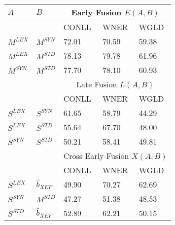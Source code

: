 \begin{table}[]
\centering
\label{my-label}
\begin{tabular}{@{}lllll@{}}
\toprule
    $A$      &    $B$       & \multicolumn{3}{c}{Early Fusion $E(A,B)$}                                            \\ \midrule
          &           & CONLL                      & WNER                      & WGLD                      \\ \cmidrule{3-5}
$M^{LEX}$ & $M^{SYN}$ & 72.01                      & 70.59                     & 59.38                     \\
$M^{LEX}$ & $M^{STD}$ & 78.13                      & 79.78                     & 61.96                     \\
$M^{SYN}$ & $M^{STD}$ & 77.70                      & 78.10                     & 60.93                     \\
\midrule
          &           & \multicolumn{3}{c}{Late Fusion $L(A,B)$}                                             \\
\midrule     
          &           & CONLL                      & WNER                      & WGLD                      \\ \cmidrule{3-5}
$S^{LEX}$ & $S^{SYN}$ & 61.65                      & 58.79                     & 44.29                     \\
$S^{LEX}$ & $S^{STD}$ & 55.64                      & 67.70                     & 48.00                     \\
$S^{SYN}$ & $S^{STD}$ & 50.21                      & 58.41                     & 49.81                     \\
\midrule
          &           & \multicolumn{3}{c}{Cross Early Fusion $X(A,B)$} \\
\midrule
          &           & CONLL                      & WNER                      & WGLD                      \\ \cmidrule{3-5}
$S^{LEX}$ & $\hat{b}_{\scriptscriptstyle XEF}$        & 49.90                      & 70.27                     & 62.69                     \\
$S^{SYN}$ & $M^{STD}$ & 47.27                      & 51.38                     & 48.53                     \\
$S^{STD}$ & $\hat{b}_{\scriptscriptstyle XEF}$        & 52.89                      & 62.21                     & 50.15                     \\

\end{tabular}
\end{table}
